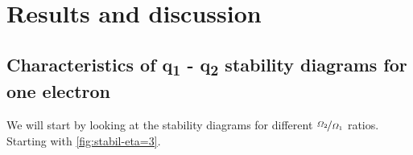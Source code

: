 \chapter{Results and discussion}
\label{chap:results}

\section{Characteristics of q\textsubscript{1} - q\textsubscript{2} stability diagrams for one electron}
\label{sec:one electron stability}


We will start by looking at the stability diagrams for different $\nicefrac{\Omega_2}{\Omega_1}$ ratios. Starting with \ref{fig:stabil-eta=3}.

